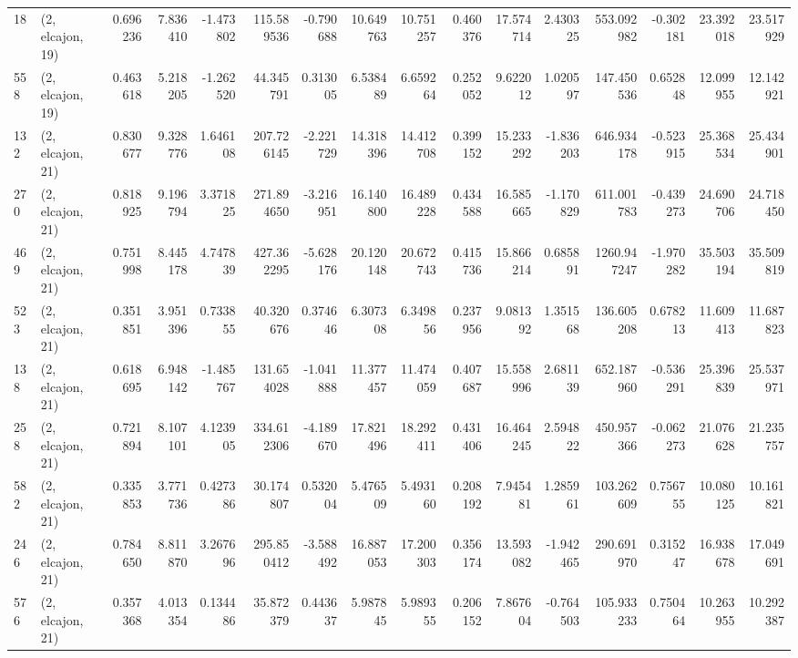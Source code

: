 \begin{tabular}{llrrrrrrrrrrrrrr}
18  &  (2, elcajon, 19) &   0.696236 &   7.836410 &  -1.473802 &   115.589536 &  -0.790688 &  10.649763 &  10.751257 &  0.460376 &  17.574714 &   2.430325 &    553.092982 &  -0.302181 &   23.392018 &   23.517929 \\
558 &  (2, elcajon, 19) &   0.463618 &   5.218205 &  -1.262520 &    44.345791 &   0.313005 &   6.538489 &   6.659264 &  0.252052 &   9.622012 &   1.020597 &    147.450536 &   0.652848 &   12.099955 &   12.142921 \\
132 &  (2, elcajon, 21) &   0.830677 &   9.328776 &   1.646108 &   207.726145 &  -2.221729 &  14.318396 &  14.412708 &  0.399152 &  15.233292 &  -1.836203 &    646.934178 &  -0.523915 &   25.368534 &   25.434901 \\
270 &  (2, elcajon, 21) &   0.818925 &   9.196794 &   3.371825 &   271.894650 &  -3.216951 &  16.140800 &  16.489228 &  0.434588 &  16.585665 &  -1.170829 &    611.001783 &  -0.439273 &   24.690706 &   24.718450 \\
469 &  (2, elcajon, 21) &   0.751998 &   8.445178 &   4.747839 &   427.362295 &  -5.628176 &  20.120148 &  20.672743 &  0.415736 &  15.866214 &   0.685891 &   1260.947247 &  -1.970282 &   35.503194 &   35.509819 \\
523 &  (2, elcajon, 21) &   0.351851 &   3.951396 &   0.733855 &    40.320676 &   0.374646 &   6.307308 &   6.349856 &  0.237956 &   9.081392 &   1.351568 &    136.605208 &   0.678213 &   11.609413 &   11.687823 \\
138 &  (2, elcajon, 21) &   0.618695 &   6.948142 &  -1.485767 &   131.654028 &  -1.041888 &  11.377457 &  11.474059 &  0.407687 &  15.558996 &   2.681139 &    652.187960 &  -0.536291 &   25.396839 &   25.537971 \\
258 &  (2, elcajon, 21) &   0.721894 &   8.107101 &   4.123905 &   334.612306 &  -4.189670 &  17.821496 &  18.292411 &  0.431406 &  16.464245 &   2.594822 &    450.957366 &  -0.062273 &   21.076628 &   21.235757 \\
582 &  (2, elcajon, 21) &   0.335853 &   3.771736 &   0.427386 &    30.174807 &   0.532004 &   5.476509 &   5.493160 &  0.208192 &   7.945481 &   1.285961 &    103.262609 &   0.756755 &   10.080125 &   10.161821 \\
246 &  (2, elcajon, 21) &   0.784650 &   8.811870 &   3.267696 &   295.850412 &  -3.588492 &  16.887053 &  17.200303 &  0.356174 &  13.593082 &  -1.942465 &    290.691970 &   0.315247 &   16.938678 &   17.049691 \\
576 &  (2, elcajon, 21) &   0.357368 &   4.013354 &   0.134486 &    35.872379 &   0.443637 &   5.987845 &   5.989355 &  0.206152 &   7.867604 &  -0.764503 &    105.933233 &   0.750464 &   10.263955 &   10.292387 \\

\end{tabular}
